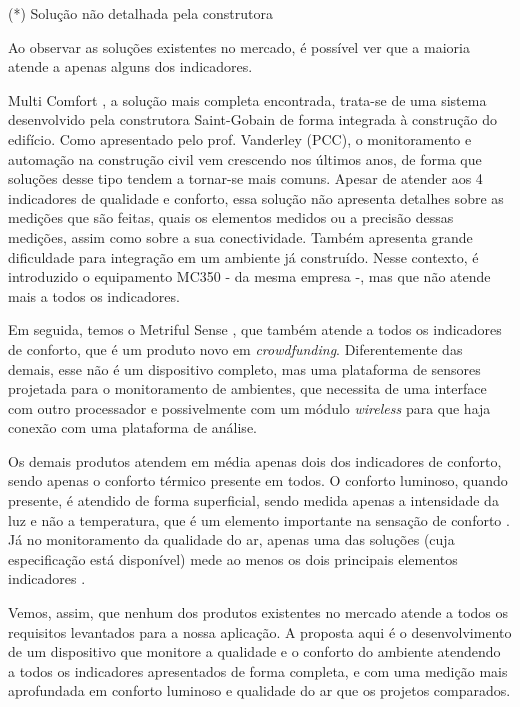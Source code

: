 \documentclass[monografia.tex]{subfiles}
\begin{document}
\begin{flushright}
(*) Solução não detalhada pela construtora
\end{flushright}


Ao observar as soluções existentes no mercado, é possível ver que a maioria atende a apenas alguns dos indicadores. 

Multi Comfort \cite{multicomfort}, a solução mais completa encontrada, trata-se de uma sistema desenvolvido pela construtora Saint-Gobain de forma integrada à construção do edifício. Como apresentado pelo prof. Vanderley (PCC), o monitoramento e automação na construção civil vem crescendo nos últimos anos, de forma que soluções desse tipo tendem a tornar-se mais comuns. 
Apesar de atender aos 4 indicadores de qualidade e conforto, essa solução não apresenta detalhes sobre as medições que são feitas, quais os elementos medidos ou a precisão dessas medições, assim como sobre a sua conectividade. Também apresenta grande dificuldade para integração em um ambiente já construído. Nesse contexto, é introduzido o equipamento MC350\cite{mc350} - da mesma empresa -, mas que não atende mais a todos os indicadores. 

Em seguida, temos o Metriful Sense \cite{metriful}, que também atende a todos os indicadores de conforto, que é um produto novo em \textit{crowdfunding}. Diferentemente das demais, esse não é um dispositivo completo, mas uma plataforma de sensores projetada para o monitoramento de ambientes, que necessita de uma interface com outro processador e possivelmente com um módulo \textit{wireless} para que haja conexão com uma plataforma de análise. 

Os demais produtos atendem em média apenas dois dos indicadores de conforto, sendo apenas o conforto térmico presente em todos. O conforto luminoso, quando presente, é atendido de forma superficial, sendo medida apenas a intensidade da luz e não a temperatura, que é um elemento importante na sensação de conforto \cite{VisualComfort}. Já no monitoramento da qualidade do ar, apenas uma das soluções \cite{ECOMLITE} (cuja especificação está disponível) mede ao menos os dois principais elementos indicadores \cite{AirQuality}. 

Vemos, assim, que nenhum dos produtos existentes no mercado atende a todos os requisitos levantados para a nossa aplicação. A proposta aqui é o desenvolvimento de um dispositivo que monitore a qualidade e o conforto do ambiente atendendo a todos os indicadores apresentados de forma completa, e com uma medição mais aprofundada em conforto luminoso e qualidade do ar que os projetos comparados. 
\end{document}
